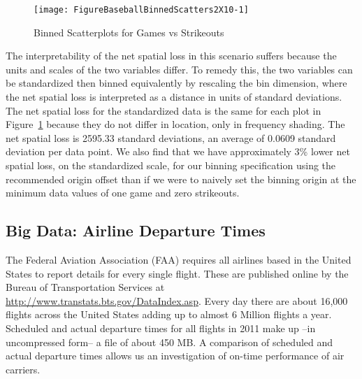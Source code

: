 \documentclass[11pt]{isuthesis}\usepackage[]{graphicx}\usepackage[]{color}
\newenvironment{knitrout}{}{} %
\begin{document}
\begin{knitrout}
\color{fgcolor}\begin{figure}[h]

{\centering \texttt{[image: FigureBaseballBinnedScatters2X10-1]} 

}

\caption[Binned Scatterplots for Games vs Strikeouts]{Binned Scatterplots for Games vs Strikeouts}\label{fig:BaseballBinnedScatters2X10}
\end{figure}


\end{knitrout}

The interpretability of the net spatial loss in this scenario suffers because the units and scales of the two variables differ. To remedy this, the two variables can be standardized then binned equivalently by rescaling the bin dimension, where the net spatial loss is interpreted as a distance in units of standard deviations. The net spatial loss for the standardized data is the same for each plot in Figure~\ref{fig:BaseballBinnedScatters2X10} because they do not differ in location, only in frequency shading. The net spatial loss is 2595.33 standard deviations, an average of 0.0609 standard deviation per data point. We also find that we have approximately 3\% lower net spatial loss, on the standardized scale, for our binning specification using the recommended origin offset than if we were to naively set the binning origin at the minimum data values of one game and zero strikeouts. 


\subsection{Big Data: Airline Departure Times}
The Federal Aviation Association (FAA) requires all airlines based in the United States to report   details for every single flight. These are published online by the Bureau of Transportation Services at \url{http://www.transtats.bts.gov/DataIndex.asp}. 
Every day there are about 16,000 flights across the United States adding up to almost 6 Million flights a year. Scheduled and actual departure times for all flights in 2011 make up --in uncompressed form-- a file of about 450 MB. A comparison of scheduled and actual departure times allows us an investigation of on-time performance of air carriers.
\end{document}
